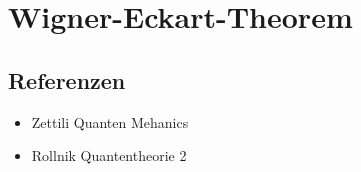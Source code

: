 
\usepackage{amsmath} 





\section*{Wigner-Eckart-Theorem}









\subsection*{Referenzen}
\begin{itemize}
\item Zettili Quanten Mehanics
\item Rollnik Quantentheorie 2
\end{itemize}



